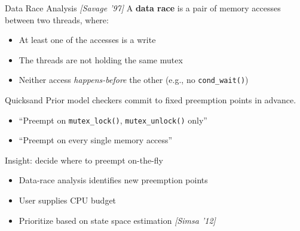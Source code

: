 \documentclass[xcolor=dvipsnames]{beamer}
\begin{document}
\begin{frame}{Data Race Analysis {\em [Savage '97]}}
	A {\bf data race} is a pair of memory accesses between two threads, where:
	\begin{itemize}
		\item At least one of the accesses is a write
		\item The threads are not holding the same mutex
		\item Neither access {\em happens-before} the other
			(e.g., no \texttt{cond\_wait()})
	\end{itemize}
\end{frame}
\begin{frame}{Quicksand}
	Prior model checkers commit to fixed preemption points in advance.
	\begin{itemize}
		\item ``Preempt on {\tt mutex\_lock()}, {\tt mutex\_unlock()} only''
		\item ``Preempt on every single memory access''
	\end{itemize}
	\linegap

	Insight: decide where to preempt on-the-fly
	\begin{itemize}
		\item Data-race analysis identifies new preemption points
		\item User supplies CPU budget
		\item Prioritize based on state space estimation {\em [Simsa '12]}
	\end{itemize}

\end{frame}
\end{document}
